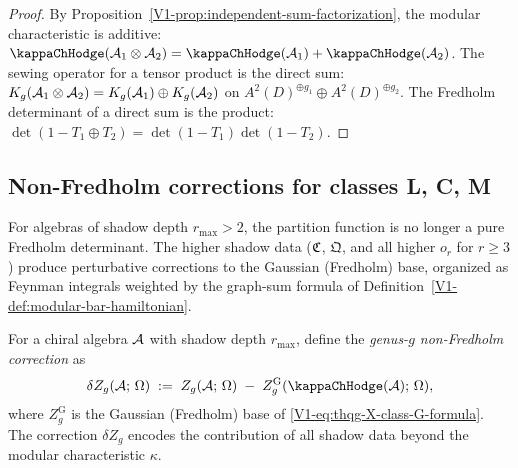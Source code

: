 \begin{proof}
By Proposition~\ref{V1-prop:independent-sum-factorization},
the modular characteristic is additive:
$\kappaChHodge(\cA_1 \otimes \cA_2)
= \kappaChHodge(\cA_1) + \kappaChHodge(\cA_2)$.
The sewing operator for a tensor product is the direct sum:
$K_g(\mathcal{A}_1 \otimes \mathcal{A}_2)
= K_g(\mathcal{A}_1) \oplus K_g(\mathcal{A}_2)$
on $A^2(D)^{\oplus g_1} \oplus A^2(D)^{\oplus g_2}$.
The Fredholm determinant of a direct sum is the product:
$\det(1 - T_1 \oplus T_2) = \det(1-T_1)\det(1-T_2)$.
\end{proof}

%
%

\subsection{Non-Fredholm corrections for classes L, C, M}
\label{subsec:thqg-X-non-fredholm}
\label{subsec:thqg-non-fredholm}%
For algebras of shadow depth $r_{\max} > 2$, the partition
function is no longer a pure Fredholm determinant. The higher
shadow data ($\mathfrak{C}$, $\mathfrak{Q}$, and all higher
$o_r$ for $r \geq 3$) produce perturbative corrections
to the Gaussian (Fredholm) base, organized as Feynman
integrals weighted by the graph-sum formula of
Definition~\ref*{V1-def:modular-bar-hamiltonian}.

\begin{definition}%
%
%
For a chiral algebra $\mathcal{A}$ with shadow depth $r_{\max}$, define
the \emph{genus-$g$ non-Fredholm correction} as
\begin{equation}%
\delta Z_g(\cA;\,\Omega)
\;:=\;
Z_g(\cA;\,\Omega)
\;-\;
Z_g^{\mathrm{G}}(\kappaChHodge(\cA);\,\Omega),
\end{equation}
where $Z_g^{\mathrm{G}}$ is the Gaussian (Fredholm) base of
\eqref{V1-eq:thqg-X-class-G-formula}. The correction
$\delta Z_g$ encodes the contribution of all shadow data
beyond the modular characteristic $\kappa$.
\end{definition}

